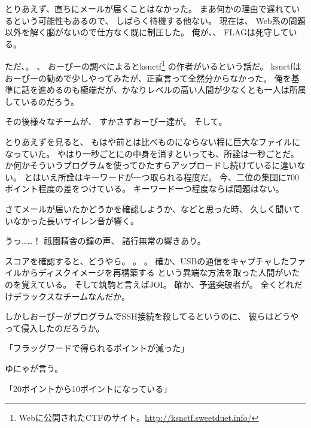 とりあえず、直ちにメールが届くことはなかった。
まあ何かの理由で遅れているという可能性もあるので、
しばらく待機する他ない。
現在は、
Web系の問題以外を解く脳がないので仕方なく既に制圧した。
俺が、、
FLAGは死守している。

ただ、。
、
おーぴーの調べによるとksnctf\footnote{Webに公開されたCTFのサイト。\url{http://ksnctf.sweetduet.info/}}%
の作者がいるという話だ。
ksnctfはおーぴーの勧めで少しやってみたが、正直言って全然分からなかった。
俺を基準に話を進めるのも極端だが、かなりレベルの高い人間が少なくとも一人は所属しているのだろう。

その後様々なチームが、
すかさずおーぴー達が。
そして。

とりあえずを見ると、
もはや前とは比べものにならない程に巨大なファイルになっていた。
やはり一秒ごとにの中身を消すといっても、所詮は一秒ごとだ。
か何かそういうプログラムを使ってひたすらアップロードし続けているに違いない。
とはいえ所詮はキーワードが一つ取られる程度だ。
今、二位の集団に700ポイント程度の差をつけている。
キーワード一つ程度ならば問題はない。

さてメールが届いたかどうかを確認しようか、などと思った時、
久しく聞いていなかった長いサイレン音が響く。

うっ……！
祗園精舎の鐘の声、
諸行無常の響きあり。

スコアを確認すると、どうやら。
。
。
確か、USBの通信をキャプチャしたファイルからディスクイメージを再構築する
という異端な方法を取った人間がいたのを覚えている。
そして筑駒と言えばJOI。
確か、予選突破者が。
全くどれだけデラックスなチームなんだか。

しかしおーぴーがプログラムでSSH接続を殺してるというのに、
彼らはどうやって侵入したのだろうか。

「フラッグワードで得られるポイントが減った」

ゆにゃが言う。

「20ポイントから10ポイントになっている」

